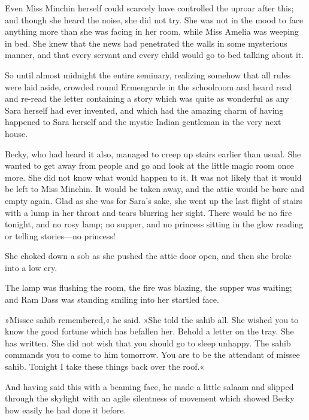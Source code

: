 Even Miss Minchin herself could scarcely have controlled the uproar after this; and though she heard the noise, she did not try. She was not in the mood to face anything more than she was facing in her room, while Miss Amelia was weeping in bed. She knew that the news had penetrated the walls in some mysterious manner, and that every servant and every child would go to bed talking about it.

So until almost midnight the entire seminary, realizing somehow that all rules were laid aside, crowded round Ermengarde in the schoolroom and heard read and re-read the letter containing a story which was quite as wonderful as any Sara herself had ever invented, and which had the amazing charm of having happened to Sara herself and the mystic Indian gentleman in the very next house.

Becky, who had heard it also, managed to creep up stairs earlier than usual. She wanted to get away from people and go and look at the little magic room once more. She did not know what would happen to it. It was not likely that it would be left to Miss Minchin. It would be taken away, and the attic would be bare and empty again. Glad as she was for Sara's sake, she went up the last flight of stairs with a lump in her throat and tears blurring her sight. There would be no fire tonight, and no rosy lamp; no supper, and no princess sitting in the glow reading or telling stories—no princess!

She choked down a sob as she pushed the attic door open, and then she broke into a low cry.

The lamp was flushing the room, the fire was blazing, the supper was waiting; and Ram Dass was standing smiling into her startled face.

»Missee sahib remembered,« he said. »She told the sahib all. She wished you to know the good fortune which has befallen her. Behold a letter on the tray. She has written. She did not wish that you should go to sleep unhappy. The sahib commands you to come to him tomorrow. You are to be the attendant of missee sahib. Tonight I take these things back over the roof.«

And having said this with a beaming face, he made a little salaam and slipped through the skylight with an agile silentness of movement which showed Becky how easily he had done it before.